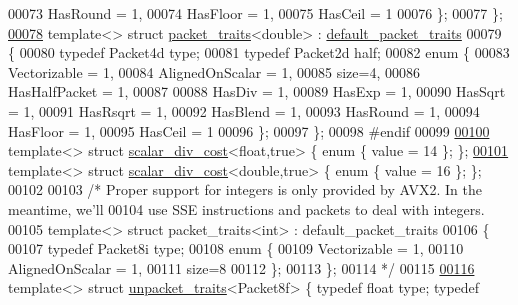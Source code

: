 \begin{DoxyCode}
00073     HasRound = 1,
00074     HasFloor = 1,
00075     HasCeil = 1
00076   \};
00077 \};
\hyperlink{struct_eigen_1_1internal_1_1packet__traits_3_01double_01_4}{00078} \textcolor{keyword}{template}<> \textcolor{keyword}{struct }\hyperlink{struct_eigen_1_1internal_1_1packet__traits}{packet\_traits}<double> : \hyperlink{struct_eigen_1_1internal_1_1default__packet__traits}{default\_packet\_traits}
00079 \{
00080   \textcolor{keyword}{typedef} Packet4d type;
00081   \textcolor{keyword}{typedef} Packet2d half;
00082   \textcolor{keyword}{enum} \{
00083     Vectorizable = 1,
00084     AlignedOnScalar = 1,
00085     size=4,
00086     HasHalfPacket = 1,
00087 
00088     HasDiv  = 1,
00089     HasExp  = 1,
00090     HasSqrt = 1,
00091     HasRsqrt = 1,
00092     HasBlend = 1,
00093     HasRound = 1,
00094     HasFloor = 1,
00095     HasCeil = 1
00096   \};
00097 \};
00098 \textcolor{preprocessor}{#endif}
00099 
\hyperlink{struct_eigen_1_1internal_1_1scalar__div__cost_3_01float_00_01true_01_4}{00100} \textcolor{keyword}{template}<> \textcolor{keyword}{struct }\hyperlink{struct_eigen_1_1internal_1_1scalar__div__cost}{scalar\_div\_cost}<float,true> \{ \textcolor{keyword}{enum} \{ value = 14 \}; \};
\hyperlink{struct_eigen_1_1internal_1_1scalar__div__cost_3_01double_00_01true_01_4}{00101} \textcolor{keyword}{template}<> \textcolor{keyword}{struct }\hyperlink{struct_eigen_1_1internal_1_1scalar__div__cost}{scalar\_div\_cost}<double,true> \{ \textcolor{keyword}{enum} \{ value = 16 \}; \};
00102 
00103 \textcolor{comment}{/* Proper support for integers is only provided by AVX2. In the meantime, we'll}
00104 \textcolor{comment}{   use SSE instructions and packets to deal with integers.}
00105 \textcolor{comment}{template<> struct packet\_traits<int>    : default\_packet\_traits}
00106 \textcolor{comment}{\{}
00107 \textcolor{comment}{  typedef Packet8i type;}
00108 \textcolor{comment}{  enum \{}
00109 \textcolor{comment}{    Vectorizable = 1,}
00110 \textcolor{comment}{    AlignedOnScalar = 1,}
00111 \textcolor{comment}{    size=8}
00112 \textcolor{comment}{  \};}
00113 \textcolor{comment}{\};}
00114 \textcolor{comment}{*/}
00115 
\hyperlink{struct_eigen_1_1internal_1_1unpacket__traits_3_01_packet8f_01_4}{00116} \textcolor{keyword}{template}<> \textcolor{keyword}{struct }\hyperlink{struct_eigen_1_1internal_1_1unpacket__traits}{unpacket\_traits}<Packet8f> \{ \textcolor{keyword}{typedef} \textcolor{keywordtype}{float}  type; \textcolor{keyword}{typedef} 

\end{DoxyCode}
